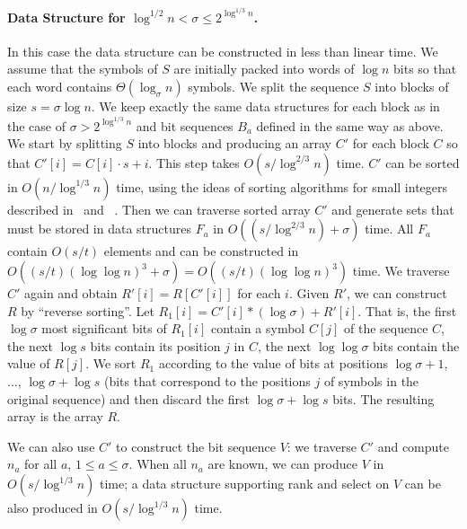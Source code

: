\documentclass[11pt]{article}\usepackage{fullpage}
\begin{document}
\paragraph{Data Structure  for $\log^{1/2}n < \sigma\le 2^{\log^{1/3}n}$.}
In this case the data structure can be constructed in less than linear time. We assume that the symbols of $S$ are initially packed into words of $\log n$ bits so that each word contains $\Theta(\log_{\sigma}n)$ symbols. 
We split the sequence $S$ into blocks of size $s=\sigma\log n$. We keep exactly the same 
data structures for each block as in the case of  $\sigma> 2^{\log^{1/3}n}$ and bit sequences $B_a$ defined in the same way as above. 
We start by splitting $S$ into blocks and producing an array $C'$ for each block $C$ so that 
$C'[i]=C[i]\cdot s + i$. This step takes $O(s/\log^{2/3}n)$ time. 
$C'$ can be sorted in $O(n/\log^{1/3}n)$ time, using the ideas of sorting algorithms for small integers described in~\cite{AnderssonHNR95} and~\cite{AlbersH97} . Then we can traverse sorted array $C'$ and generate sets that must be stored in data structures $F_a$ in $O((s/\log^{2/3}n)+\sigma)$ time. 
All $F_a$ contain $O(s/t)$ elements and can be constructed in $O((s/t)(\log\log n)^3+ \sigma)=O((s/t)(\log\log n)^3)$ time. 
We traverse $C'$ again and obtain $R'[i]=R[C'[i]]$ for each $i$. Given $R'$, we can construct $R$ by ``reverse sorting''. Let $R_1[i]=C'[i]*(\log \sigma)+ R'[i]$. That is, the first $\log \sigma$ most significant  bits of $R_1[i]$ contain a symbol $C[j]$ of the sequence $C$, the next $\log s$ bits contain its position $j$ in $C$, the next $\log\log \sigma$ bits contain the value of $R[j]$. We sort $R_1$ according to 
the value of bits at positions $\log \sigma +1$, $\ldots$, $\log \sigma+\log s$ (bits that correspond to the positions $j$ of symbols in the original sequence) and then discard the first $\log \sigma +\log s$ bits. 
The resulting array is the array $R$. 

We can also use $C'$ to construct the bit sequence $V$: we traverse $C'$ and compute $n_a$ for all $a$, $1\le a\le \sigma$. When all $n_a$ are known, we can produce $V$ in $O(s/\log^{1/3} n)$ time; a data structure supporting rank and select on $V$ can be also produced in $O(s/\log^{1/3}n)$ time. 
\end{document}
